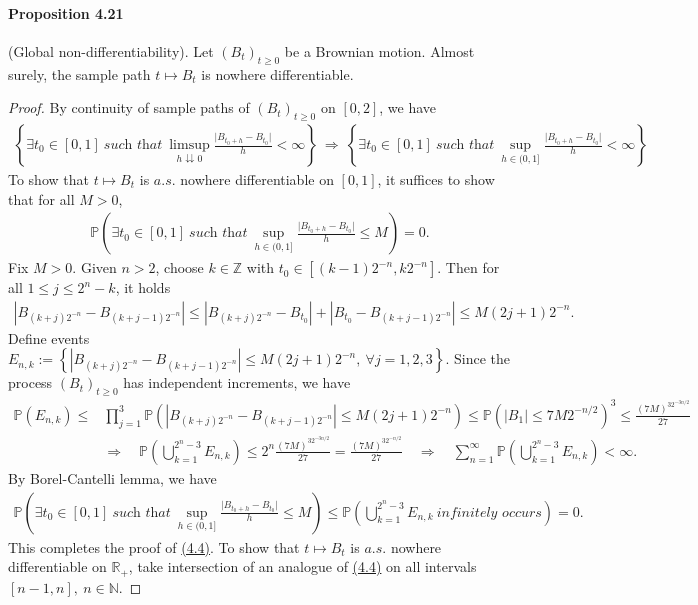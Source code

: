 \documentclass{article}
\numberwithin{equation}{section}
\renewcommand{\P}{\mathbb{P}}
\theoremstyle{plain}
\theoremstyle{definition}
\begin{document}
\paragraph{Proposition 4.21\label{prop:4.21}} (Global non-differentiability). Let $(B_t)_{t\geq 0}$ be a Brownian motion. Almost surely, the sample path $t\mapsto B_t$ is nowhere differentiable.
\begin{proof}
By continuity of sample paths of $(B_t)_{t\geq 0}$ on $[0,2]$, we have 
\begin{align*}
	\left\{\exists t_0\in[0,1]\ \textit{such that}\ \limsup_{h\downdownarrows 0}\frac{\vert B_{t_0+h}-B_{t_0}\vert}{h}<\infty\right\}\ \Rightarrow\ \left\{\exists t_0\in[0,1]\ \textit{such that}\ \sup_{h\in(0,1]}\frac{\vert B_{t_0+h}-B_{t_0}\vert}{h}<\infty\right\}
\end{align*}
To show that $t\mapsto B_t$ is $a.s.$ nowhere differentiable on $[0,1]$, it suffices to show that for all $M>0$,
\begin{align*}
	\P\left(\exists t_0\in[0,1]\ \textit{such that}\ \sup_{h\in(0,1]}\frac{\vert B_{t_0+h}-B_{t_0}\vert}{h}\leq M\right)=0.\tag{4.4}\label{eq:4.4}
\end{align*}
Fix $M>0$. Given $n>2$, choose $k\in\mathbb{Z}$ with $t_0\in\left[(k-1)2^{-n},k2^{-n}\right]$. Then for all $1\leq j\leq 2^n-k$, it holds
\begin{align*}
	\left\vert B_{(k+j)2^{-n}}-B_{(k+j-1)2^{-n}}\right\vert\leq\left\vert B_{(k+j)2^{-n}}-B_{t_0}\right\vert + \left\vert B_{t_0}-B_{(k+j-1)2^{-n}}\right\vert\leq M(2j+1)2^{-n}.
\end{align*}
Define events $E_{n,k}:=\left\{\left\vert B_{(k+j)2^{-n}}-B_{(k+j-1)2^{-n}}\right\vert\leq M(2j+1)2^{-n},\ \forall j=1,2,3\right\}$. Since the process $(B_t)_{t\geq 0}$ has independent increments, we have
\begin{align*}
	\P(E_{n,k})\leq&\prod_{j=1}^3\P\left(\left\vert B_{(k+j)2^{-n}}-B_{(k+j-1)2^{-n}}\right\vert\leq M(2j+1)2^{-n}\right)\leq\P\left(\vert B_1\vert\leq 7M2^{-n/2}\right)^3\leq\frac{(7M)^32^{-3n/2}}{27}\\
	&\Rightarrow\quad\P\left(\bigcup_{k=1}^{2^n-3}E_{n,k}\right)\leq 2^n\frac{(7M)^32^{-3n/2}}{27}=\frac{(7M)^32^{-n/2}}{27}\quad\Rightarrow\quad \sum_{n=1}^\infty \P\left(\bigcup_{k=1}^{2^n-3}E_{n,k}\right)<\infty.
\end{align*}
By Borel-Cantelli lemma, we have
\begin{align*}
	\P\left(\exists t_0\in[0,1]\ \textit{such that}\ \sup_{h\in(0,1]}\frac{\vert B_{t_0+h}-B_{t_0}\vert}{h}\leq M\right)\leq\P\left(\bigcup_{k=1}^{2^n-3}E_{n,k}\ \textit{infinitely occurs}\right) = 0.
\end{align*}
This completes the proof of \hyperref[eq:4.4]{(4.4)}. To show that $t\mapsto B_t$ is $a.s.$ nowhere differentiable on $\mathbb{R}_+$, take intersection of an analogue of \hyperref[eq:4.4]{(4.4)} on all intervals $[n-1,n],\ n\in\mathbb{N}$.
\end{proof}
\end{document}

